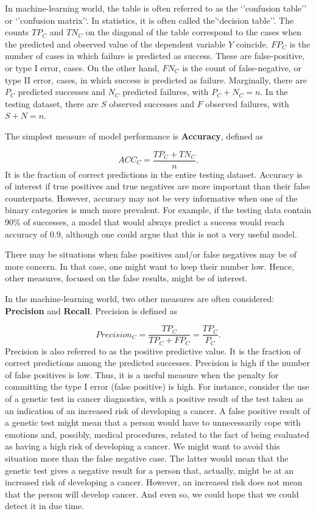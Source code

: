 \documentclass[]{krantz}
\begin{document}
In machine-learning world, the table is often referred to as the `'confusion table'' or `'confusion matrix'`. In statistics, it is often called the'`decision table''. The counts \(TP_C\) and \(TN_C\) on the diagonal of the table correspond to the cases when the predicted and observed value of the dependent variable \(Y\) coincide. \(FP_C\) is the number of cases in which failure is predicted as success. These are false-positive, or type I error, cases. On the other hand, \(FN_C\) is the count of false-negative, or type II error, cases, in which success is predicted as failure. Marginally, there are \(P_C\) predicted successes and \(N_C\) predicted failures, with \(P_C+N_C=n\). In the testing dataset, there are \(S\) observed successes and \(F\) observed failures, with \(S+N=n\).

The simplest measure of model performance is \textbf{Accuracy}, defined as

\[
ACC_C = \frac{TP_C+TN_C}{n}.
\]
It is the fraction of correct predictions in the entire testing dataset. Accuracy is of interest if true positives and true negatives are more important than their false counterparts. However, accuracy may not be very informative when one of the binary categories is much more prevalent. For example, if the testing data contain 90\% of successes, a model that would always predict a success would reach accuracy of 0.9, although one could argue that this is not a very useful model.

There may be situations when false positives and/or false negatives may be of more concern. In that case, one might want to keep their number low. Hence, other measures, focused on the false results, might be of interest.

In the machine-learning world, two other measures are often considered: \textbf{Precision} and \textbf{Recall}. Precision is defined as

\[
Precision_C = \frac{TP_C}{TP_C+FP_C} = \frac{TP_C}{P_C}.
\]
Precision is also referred to as the positive predictive value. It is the fraction of correct predictions among the predicted successes. Precision is high if the number of false positives is low. Thus, it is a useful measure when the penalty for committing the type I error (false positive) is high. For instance, consider the use of a genetic test in cancer diagnostics, with a positive result of the test taken as an indication of an increased risk of developing a cancer. A false positive result of a genetic test might mean that a person would have to unnecessarily cope with emotions and, possibly, medical procedures, related to the fact of being evaluated as having a high risk of developing a cancer. We might want to avoid this situation more than the false negative case. The latter would mean that the genetic test gives a negative result for a person that, actually, might be at an increased risk of developing a cancer. However, an increased risk does not mean that the person will develop cancer. And even so, we could hope that we could detect it in due time.
\end{document}
